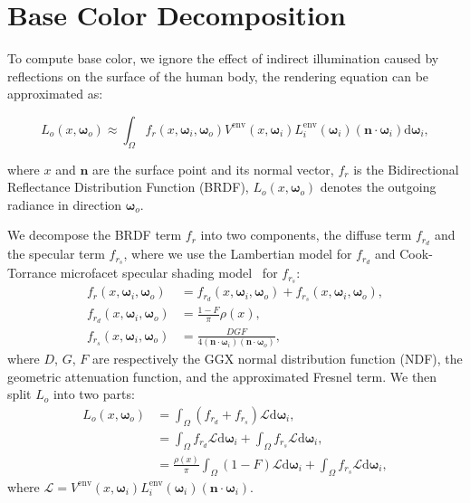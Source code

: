 \section{Base Color Decomposition}
To compute base color, we ignore the effect of indirect illumination caused by reflections on the surface of the human body, the rendering equation can be approximated as:
 \begin{footnotesize}  
\begin{equation}
	L_{o}\left(x,\boldsymbol{\omega}_{o}\right) \approx \int_{\Omega} f_{r}\left(x,\boldsymbol{\omega}_{i}, \boldsymbol{\omega}_{o}\right)  V^{\text{env}}\left(x,\boldsymbol{\omega}_{i}\right) L_{i}^{\text{env}}\left(\boldsymbol{\omega}_{i}\right) (\mathbf{n} \cdot \boldsymbol{\omega}_{i}) \mathrm{d} \boldsymbol{\omega}_{i},
\end{equation}
\end{footnotesize}
where $x$ and $\mathbf{n}$ are the surface point and its normal vector, $f_r$ is the Bidirectional Reflectance Distribution Function (BRDF), $L_o\left(x,\boldsymbol{\omega}_{o}\right)$ denotes the outgoing radiance in direction $\boldsymbol{\omega}_o$.

We decompose the BRDF term $f_r$ into two components, the diffuse term $f_{r_d}$ and the specular term $f_{r_s}$, where we use the Lambertian model for $f_{r_d}$ and Cook-Torrance microfacet specular shading model~\cite{cook1982reflectance} for $f_{r_s}$:
\begin{align}
 	f_{r}\left(x,\boldsymbol{\omega}_{i}, \boldsymbol{\omega}_{o}\right) &= f_{r_d}\left(x,\boldsymbol{\omega}_{i}, \boldsymbol{\omega}_{o}\right) + f_{r_s}\left(x,\boldsymbol{\omega}_{i}, \boldsymbol{\omega}_{o}\right), \\
    f_{r_d}\left(x,\boldsymbol{\omega}_{i}, \boldsymbol{\omega}_{o}\right) &= 
    \frac{1-F}{\pi} \rho(x), \\
    f_{r_s}\left(x,\boldsymbol{\omega}_{i}, \boldsymbol{\omega}_{o}\right) &= \frac{D G F}{4(\mathbf{n}\cdot \boldsymbol{\omega}_{i})(\mathbf{n}\cdot \boldsymbol{\omega}_{o})},
\end{align}
where $D$, $G$, $F$ are respectively the GGX normal distribution function (NDF), the geometric attenuation function, and the approximated Fresnel term. 
We then split $L_o$ into two parts:
\begin{align}
	L_{o}\left(x,\boldsymbol{\omega}_{o}\right) &= \int_{\Omega} \left(f_{r_d} + f_{r_s} \right) \mathcal{L} \mathrm{d} \boldsymbol{\omega}_{i} , \\
    &= \int_{\Omega} f_{r_d}  \mathcal{L} \mathrm{d} \boldsymbol{\omega}_{i} +  \int_{\Omega}  f_{r_s}  \mathcal{L} \mathrm{d} \boldsymbol{\omega}_{i} ,\\
    \label{eq_Lo}
     &=  \frac{\rho(x)}{\pi} \int_{\Omega}  \left(1-F\right) \mathcal{L} \mathrm{d} \boldsymbol{\omega}_{i} +  \int_{\Omega}  f_{r_s}  \mathcal{L} \mathrm{d} \boldsymbol{\omega}_{i},
\end{align}
where $\mathcal{L} = V^{\text{env}}\left(x,\boldsymbol{\omega}_{i}\right) L_{i}^{\text{env}}\left(\boldsymbol{\omega}_{i}\right) (\mathbf{n} \cdot \boldsymbol{\omega}_{i})$.

